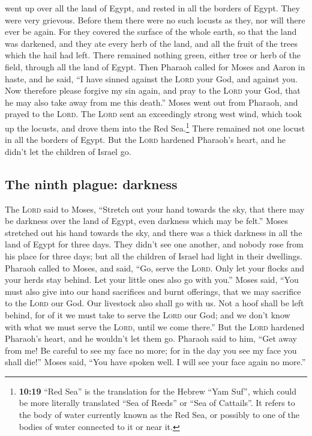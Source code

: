 went up over all the land of Egypt, and rested in all the borders of
Egypt. They were very grievous. Before them there were no such locusts
as they, nor will there ever be again.  For they covered
the surface of the whole earth, so that the land was darkened, and they
ate every herb of the land, and all the fruit of the trees which the
hail had left. There remained nothing green, either tree or herb of the
field, through all the land of Egypt.  Then Pharaoh
called for Moses and Aaron in haste, and he said, ``I have sinned
against the \textsc{Lord} your God, and against you.  Now
therefore please forgive my sin again, and pray to the \textsc{Lord}
your God, that he may also take away from me this death.''
 Moses went out from Pharaoh, and prayed to the
\textsc{Lord}.  The \textsc{Lord} sent an exceedingly
strong west wind, which took up the locusts, and drove them into the Red
Sea.\footnote{\textbf{10:19} ``Red Sea'' is the translation for the
  Hebrew ``Yam Suf'', which could be more literally translated ``Sea of
  Reeds'' or ``Sea of Cattails''. It refers to the body of water
  currently known as the Red Sea, or possibly to one of the bodies of
  water connected to it or near it.} There remained not one locust in
all the borders of Egypt.  But the \textsc{Lord} hardened
Pharaoh's heart, and he didn't let the children of Israel go.

\hypertarget{the-ninth-plague-darkness}{%
\subsection{The ninth plague:
darkness}\label{the-ninth-plague-darkness}}

 The \textsc{Lord} said to Moses, ``Stretch out your hand
towards the sky, that there may be darkness over the land of Egypt, even
darkness which may be felt.''  Moses stretched out his
hand towards the sky, and there was a thick darkness in all the land of
Egypt for three days.  They didn't see one another, and
nobody rose from his place for three days; but all the children of
Israel had light in their dwellings.  Pharaoh called to
Moses, and said, ``Go, serve the \textsc{Lord}. Only let your flocks and
your herds stay behind. Let your little ones also go with you.''
 Moses said, ``You must also give into our hand
sacrifices and burnt offerings, that we may sacrifice to the
\textsc{Lord} our God.  Our livestock also shall go with
us. Not a hoof shall be left behind, for of it we must take to serve the
\textsc{Lord} our God; and we don't know with what we must serve the
\textsc{Lord}, until we come there.''  But the
\textsc{Lord} hardened Pharaoh's heart, and he wouldn't let them go.
 Pharaoh said to him, ``Get away from me! Be careful to
see my face no more; for in the day you see my face you shall die!''
 Moses said, ``You have spoken well. I will see your face
again no more.''

